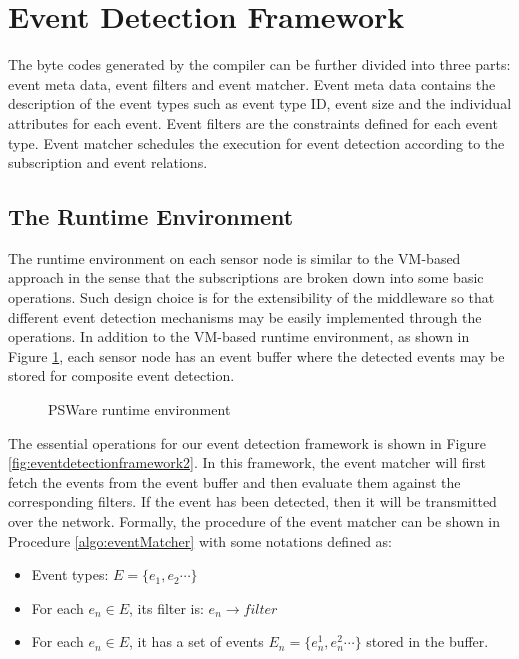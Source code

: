 \section{Event Detection Framework}
The byte codes generated by the compiler can be further divided into three parts: event meta data, event filters and event matcher. Event meta data contains the description of the event types such as event type ID, event size and the individual attributes for each event. Event filters are the constraints defined for each event type. Event matcher schedules the execution for event detection according to the subscription and event relations.

\subsection{The Runtime Environment}
The runtime environment on each sensor node is similar to the VM-based approach \cite{mate} in the sense that the subscriptions are broken down into some basic operations. Such design choice is for the extensibility of the middleware so that different event detection mechanisms may be easily implemented through the operations. In addition to the VM-based runtime environment, as shown in Figure \ref{fig:pswarevm}, each sensor node has an event buffer where the detected events may be stored for composite event detection.

\begin{figure}
\centering
{}
\caption{PSWare runtime environment}
\label{fig:pswarevm}
\end{figure}

The essential operations for our event detection framework is shown in Figure \ref{fig:eventdetectionframework2}. In this framework, the event matcher will first fetch the events from the event buffer and then evaluate them against the corresponding filters. If the event has been detected, then it will be transmitted over the network. Formally, the procedure of the event matcher can be shown in Procedure \ref{algo:eventMatcher} with some notations defined as:
\begin{itemize}
\item Event types: \(E=\{e_1, e_2 \cdots \}\)
\item For each \(e_n\in E\), its filter is: \(e_n\rightarrow filter\)
\item For each \(e_n\in E\), it has a set of events \(E_n=\{e_n^1, e_n^2 \cdots \}\) stored in the buffer.
\end{itemize}

